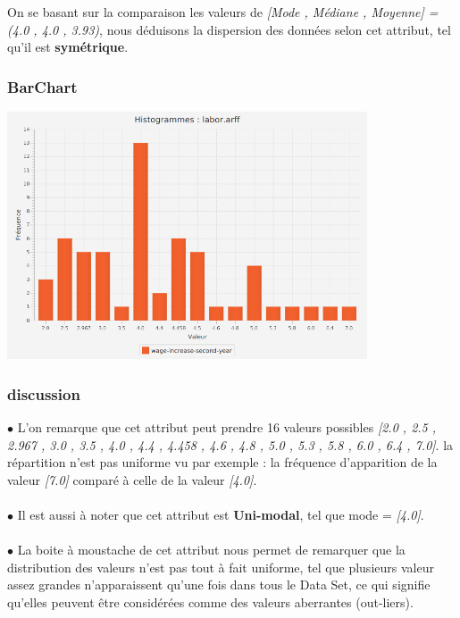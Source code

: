 \documentclass[12pt,a4paper,oneside]{book}
\begin{document}
On se basant sur la comparaison les valeurs de \textit{[Mode , Médiane , Moyenne] = (4.0 , 4.0 , 3.93)}, nous déduisons la dispersion des données selon cet attribut, tel qu'il est \textbf{symétrique}.

\subsubsection{BarChart}

\begin{center}
	\includegraphics[width=0.8\textwidth]{screens/barchart/wage-increase-second-year-barchart.png}%
	\label{labelname}%
\end{center}	

\subsubsection{discussion}	
$\bullet $ L'on remarque que cet attribut peut prendre 16 valeurs possibles \textit{[2.0 , 2.5 , 2.967 , 3.0 , 3.5 , 4.0 , 4.4 , 4.458 , 4.6 , 4.8 , 5.0 , 5.3 , 5.8  , 6.0 , 6.4 , 7.0]}. la répartition n'est pas uniforme vu par exemple : la fréquence d'apparition de la valeur \textit{[7.0]} comparé à celle de la valeur \textit{[4.0]}.\\
\textbf{ }\\
$\bullet $ Il est aussi à noter que cet attribut est \textbf{Uni-modal}, tel que mode = \textit{[4.0]}.\\
\textbf{ }\\
$\bullet $ La boite à moustache de cet attribut nous permet de remarquer que la distribution des valeurs n'est pas tout à fait uniforme, tel que plusieurs valeur assez grandes n'apparaissent qu'une fois dans tous le Data Set, ce qui signifie qu'elles peuvent être considérées comme des valeurs aberrantes (out-liers).
\end{document}

